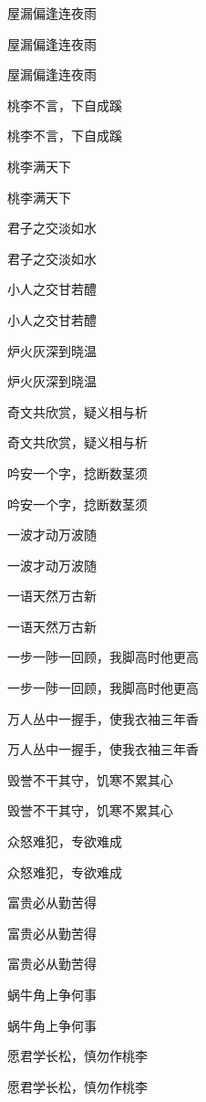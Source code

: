 \documentclass[12pt, a4paper, addpoints]{exam}
\begin{document}
\begin{multicols}{2}
\begin{questions}
\question[2] 屋漏偏逢连夜雨

\question[2] 屋漏偏逢连夜雨

\question[2] 屋漏偏逢连夜雨

\question[2] 桃李不言，下自成蹊

\question[2] 桃李不言，下自成蹊

\question[2] 桃李满天下

\question[2] 桃李满天下

\question[2] 君子之交淡如水

\question[2] 君子之交淡如水

\question[2] 小人之交甘若醴

\question[2] 小人之交甘若醴

\question[2] 炉火灰深到晓温

\question[2] 炉火灰深到晓温

\question[2] 奇文共欣赏，疑义相与析

\question[2] 奇文共欣赏，疑义相与析

\question[2] 吟安一个字，捻断数茎须

\question[2] 吟安一个字，捻断数茎须

\question[2] 一波才动万波随

\question[2] 一波才动万波随

\question[2] 一语天然万古新

\question[2] 一语天然万古新

\question[2] 一步一陟一回顾，我脚高时他更高

\question[2] 一步一陟一回顾，我脚高时他更高

\question[2] 万人丛中一握手，使我衣袖三年香

\question[2] 万人丛中一握手，使我衣袖三年香

\question[2] 毁誉不干其守，饥寒不累其心

\question[2] 毁誉不干其守，饥寒不累其心

\question[2] 众怒难犯，专欲难成

\question[2] 众怒难犯，专欲难成

\question[2] 富贵必从勤苦得

\question[2] 富贵必从勤苦得

\question[2] 富贵必从勤苦得

\question[2] 蜗牛角上争何事

\question[2] 蜗牛角上争何事

\question[2] 愿君学长松，慎勿作桃李

\question[2] 愿君学长松，慎勿作桃李


\end{questions}
\end{multicols}
\end{document}
